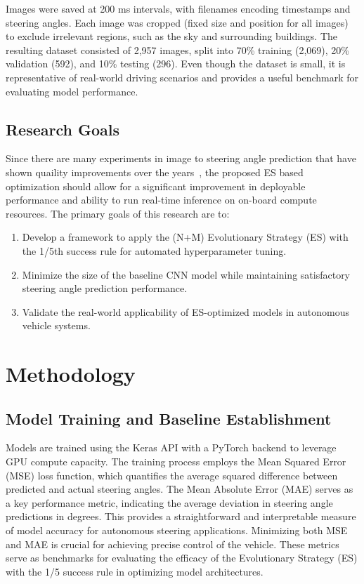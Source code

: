 \documentclass[conference]{IEEEtran}
\begin{document}
Images were saved at 200 ms intervals, with filenames encoding timestamps and steering angles. Each image was cropped (fixed size and position for all images) to exclude irrelevant regions, such as the sky and surrounding buildings. The resulting dataset consisted of 2,957 images, split into 70\% training (2,069), 20\% validation (592), and 10\% testing (296). Even though the dataset is small, it is representative of real-world driving scenarios and provides a useful benchmark for evaluating model performance.

\subsection{Research Goals}

Since there are many experiments in image to steering angle prediction that have shown quaility improvements over the years~\cite{PilotNET_application,lane_detection_good_results_zigzag,CNN_can_self_drive}, the proposed ES based optimization should allow for a significant improvement in deployable performance and ability to run real-time inference on on-board compute resources. The primary goals of this research are to:

\begin{enumerate}
    \item Develop a framework to apply the (N+M) Evolutionary Strategy (ES) with the 1/5th success rule for automated hyperparameter tuning.
    \item Minimize the size of the baseline CNN model while maintaining satisfactory steering angle prediction performance.
    \item Validate the real-world applicability of ES-optimized models in autonomous vehicle systems.
\end{enumerate}

\section{Methodology}

\subsection{Model Training and Baseline Establishment}

Models are trained using the Keras API with a PyTorch backend to leverage GPU compute capacity. The training process employs the Mean Squared Error (MSE) loss function, which quantifies the average squared difference between predicted and actual steering angles. The Mean Absolute Error (MAE) serves as a key performance metric, indicating the average deviation in steering angle predictions in degrees. This provides a straightforward and interpretable measure of model accuracy for autonomous steering applications. Minimizing both MSE and MAE is crucial for achieving precise control of the vehicle. These metrics serve as benchmarks for evaluating the efficacy of the Evolutionary Strategy (ES) with the 1/5 success rule in optimizing model architectures.
\end{document}
